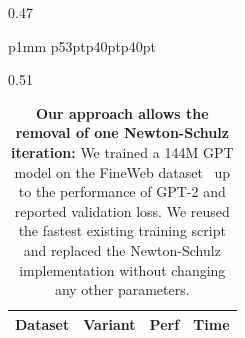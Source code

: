 \begin{table}[t]
\begin{subtable}{0.47\linewidth}
\begin{tabular}{p{1mm} p{53pt}p{40pt}p{40pt}}
        \bottomrule
        \end{tabular}
        \caption{\textbf{Our approach allows the removal of one Newton-Schulz iteration:} We trained a 144M GPT model on the FineWeb dataset~\cite{penedo2024fineweb} up to the performance of GPT-2 and reported validation loss. We reused the fastest existing training script and replaced the Newton-Schulz implementation without changing any other parameters. %
        }
        \label{tab:nanoGPT_accuracy}
\end{subtable}
\hfill
\begin{subtable}{0.51\linewidth}
    \centering
        \begin{tabular}{p{40pt}p{34pt}p{22pt}p{60pt}}
        \toprule
        \textbf{Dataset} & \textbf{Variant} & \textbf{Perf} & \textbf{Time}   \\
        \hline
        

\end{tabular}
\end{subtable}
\end{table}
